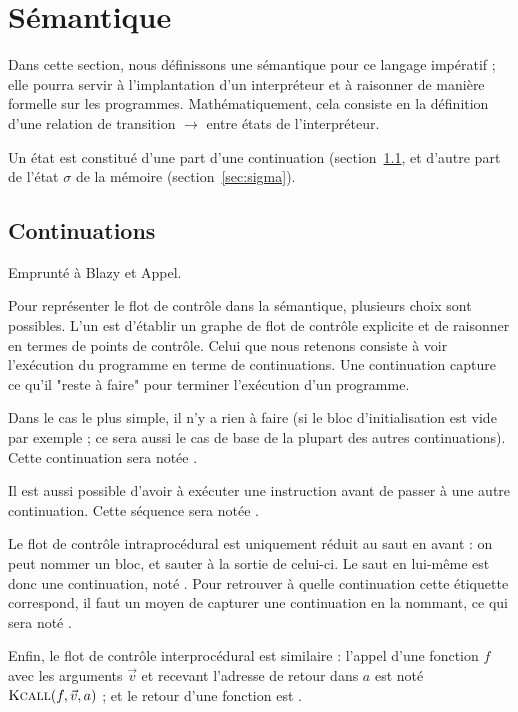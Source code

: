 \section{Sémantique}

Dans cette section, nous définissons une sémantique pour ce langage impératif ;
elle pourra servir à l'implantation d'un interpréteur et à raisonner de manière
formelle sur les programmes. Mathématiquement, cela consiste en la définition
d'une relation de transition $\rightarrow$ entre états de l'interpréteur.

Un état est constitué d'une part d'une continuation (section~\ref{sec:cont}, et
d'autre part de l'état $σ$ de la mémoire (section~\ref{sec:sigma}).

\subsection{Continuations}
\label{sec:cont}

Emprunté à Blazy et Appel\cite{cminorSL}.

Pour représenter le flot de contrôle dans la sémantique, plusieurs choix sont
possibles. L'un est d'établir un graphe de flot de contrôle explicite et de
raisonner en termes de points de contrôle. Celui que nous retenons consiste à
voir l'exécution du programme en terme de continuations. Une continuation
capture ce qu'il "reste à faire" pour terminer l'exécution d'un programme.

Dans le cas le plus simple, il n'y a rien à faire (si le bloc d'initialisation
est vide par exemple ; ce sera aussi le cas de base de la plupart des autres
continuations). Cette continuation sera notée \kPass.

Il est aussi possible d'avoir à exécuter une instruction avant de passer à une
autre continuation. Cette séquence sera notée .

Le flot de contrôle intraprocédural est uniquement réduit au saut en avant : on
peut nommer un bloc, et sauter à la sortie de celui-ci. Le saut en lui-même est
donc une continuation, noté . Pour retrouver à quelle continuation
cette étiquette correspond, il faut un moyen de capturer une continuation en la
nommant, ce qui sera noté .

Enfin, le flot de contrôle interprocédural est similaire : l'appel d'une
fonction $f$ avec les arguments $\vec{v}$ et recevant l'adresse de retour dans
$a$ est noté $\textsc{Kcall}(f, \vec{v}, a)$ ; et le retour d'une fonction est .

